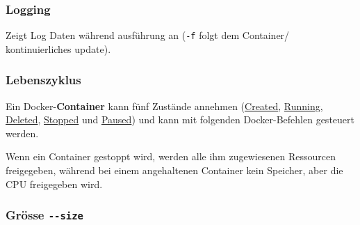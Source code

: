 \documentclass[
  10pt,
  a4paper,
]{article}
\newenvironment{Shaded}{}{}
\newcommand{\ExtensionTok}[1]{\textcolor[rgb]{0.84,0.23,0.29}{\textbf{#1}}}
\newcommand{\NormalTok}[1]{\textcolor[rgb]{0.14,0.16,0.18}{#1}}
\newcommand{\OperatorTok}[1]{\textcolor[rgb]{0.14,0.16,0.18}{#1}}
\begin{document}
\begin{multicols*}{2}
\subsubsection{\texorpdfstring{{\small \faTerminal\hspace{1mm}}
Logging}{ Logging}}\label{logging}

Zeigt Log Daten während ausführung an (\texttt{-f} folgt dem Container/
kontinuierliches update).

\begin{Shaded}
\end{Shaded}

\subsubsection{Lebenszyklus}\label{lebenszyklus}

Ein Docker-\textbf{Container} kann fünf Zustände annehmen (\ul{Created},
\ul{Running}, \ul{Deleted}, \ul{Stopped} und \ul{Paused}) und kann mit
folgenden Docker-Befehlen gesteuert werden.

\resizebox{\columnwidth}{!}{
  
}

\begin{tcolorbox}[enhanced jigsaw, coltitle=black, toprule=.15mm, colframe=quarto-callout-note-color-frame, breakable, titlerule=0mm, title=\textcolor{quarto-callout-note-color}{\faInfo}\hspace{0.5em}{Unterschied \emph{Stopped} und \emph{Paused}}, toptitle=1mm, colback=white, leftrule=.75mm, bottomtitle=1mm, colbacktitle=quarto-callout-note-color!10!white, left=2mm, bottomrule=.15mm, rightrule=.15mm, arc=.35mm, opacityback=0, opacitybacktitle=0.6]

Wenn ein Container gestoppt wird, werden alle ihm zugewiesenen
Ressourcen freigegeben, während bei einem angehaltenen Container kein
Speicher, aber die CPU freigegeben wird.

\end{tcolorbox}

\subsubsection{\texorpdfstring{{\small \faTerminal\hspace{1mm}} Grösse
\texttt{-\/-size}}{ Grösse -\/-size}}\label{gruxf6sse---size}


\end{multicols*}
\end{document}
